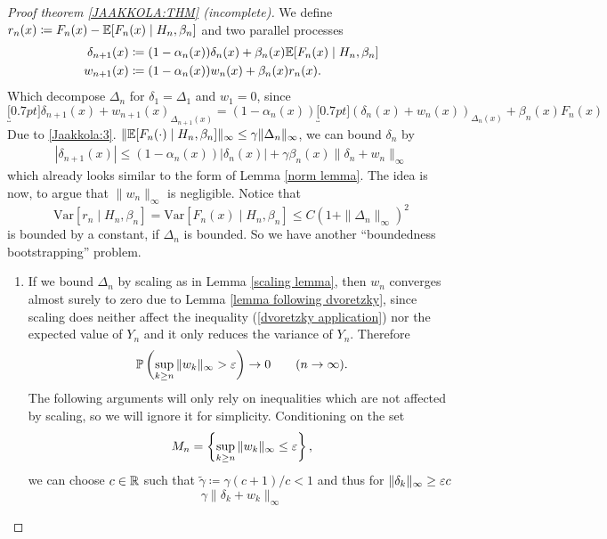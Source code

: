 \begin{proof}[Proof theorem \ref{JAAKKOLA:THM} (incomplete)]
    We define \(r_n(x)\coloneqq F_n(x)-\mathbb{E}[F_n(x)\mid H_n,\beta_n]\) and two parallel processes
    \begin{align*}
        \delta_{n+1}(x)
        &\coloneqq(1-\alpha_n(x))\delta_n(x)+\beta_n(x)\mathbb{E}[F_n(x)\mid H_n,\beta_n]\\
        w_{n+1}(x)
        &\coloneqq(1-\alpha_n(x))w_n(x)+\beta_n(x)r_n(x).
    \end{align*}
    Which decompose \(\Delta_n\) for \(\delta_1=\Delta_1\) and \(w_1=0\), since
    \[
        \underbracket[0.7pt]{\delta_{n+1}(x)+w_{n+1}(x)}_{\Delta_{n+1}(x)}
        = (1-\alpha_n(x))\underbracket[0.7pt]{(\delta_n(x)+w_n(x))}_{\Delta_n(x)}
        +\beta_n(x) F_n(x)
    \]
    Due to \ref{Jaakkola:3}. \(\|\mathbb{E}[F_n(\cdot)\mid H_n,\beta_n]\|_\infty\le \gamma \|\Delta_n\|_\infty\), we can bound \(\delta_n\) by
    \begin{align*}
        |\delta_{n+1}(x)| 
        \le (1-\alpha_n(x))|\delta_n(x)|+\gamma \beta_n(x)\|\delta_n+w_n\|_\infty
    \end{align*}
    which already looks similar to the form of Lemma \ref{norm lemma}. The idea is now, to argue that \(\|w_n\|_\infty\) is negligible. Notice that
    \[
        \text{Var}[r_n\mid H_n,\beta_n]=\text{Var}[F_n(x)\mid H_n,\beta_n]
        \le C(1+\|\Delta_n\|_\infty)^2
    \]
    is bounded by a constant, if \(\Delta_n\) is bounded. So we have another ``boundedness bootstrapping'' problem. 
\begin{enumerate}[label= Step \arabic*:, ref= Step \arabic*, leftmargin=0pt]
    \item\label{thm:step1} If we bound \(\Delta_n\) by scaling as in Lemma \ref{scaling lemma}, then \(w_n\) converges almost surely to zero due to Lemma \ref{lemma following dvoretzky}, since scaling does neither affect the inequality (\ref{dvoretzky application}) nor the expected value of \(Y_n\) and it only reduces the variance of \(Y_n\). Therefore
    \[
        \mathbb{P}\left(\sup_{k\ge n} \|w_k\|_\infty > \varepsilon\right) \to 0 \qquad (n\to \infty).
    \]
    The following arguments will only rely on inequalities which are not affected by scaling, so we will ignore it for simplicity. Conditioning on the set 
    \[
        M_n=\left\{\sup_{k\ge n} \|w_k\|_\infty \le \varepsilon \right\},
    \]
    we can choose \(c\in\mathbb{R}\) such that \(\tilde{\gamma}\coloneqq \gamma (c+1)/c <1\) and thus for \(\|\delta_k\|_\infty \ge \varepsilon c\)
    \[
        \gamma \|\delta_k +w_k\|_\infty 
\]
\end{enumerate}
\end{proof}
